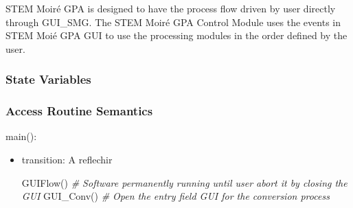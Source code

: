 \documentclass[12pt, titlepage]{article}
\newcommand{\progname}{STEM Moir{\'e} GPA}
\begin{document}
\progname{} is designed to have the process flow driven by user directly through GUI{\_}SMG. The STEM Moir{\'e} GPA Control Module uses the events in STEM Moi{\'e} GPA GUI to use the processing modules in the order defined by the user.

\subsubsection{State Variables}


\subsubsection{Access Routine Semantics}

\noindent main():
\begin{itemize}
\item transition: A reflechir 

GUIFlow()
\noindent\textit{{\#} Software permanently running until user abort it by closing the GUI} \medskip
GUI{\_}Conv()
\noindent\textit{{\#} Open the entry field GUI for the conversion process} \medskip


\end{itemize}
\end{document}
